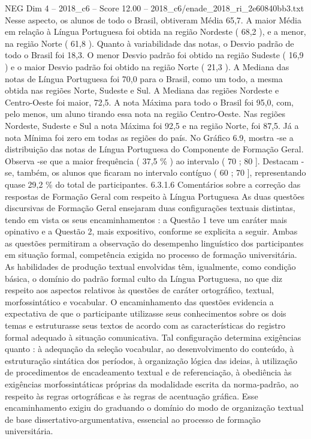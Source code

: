 \begin{textsample}{NEG Dim 4 – 2018\_c6 – Score 12.00 – 2018\_c6/enade\_2018\_ri\_2e60840bb3.txt}
Nesse aspecto, os alunos de todo o Brasil, obtiveram Média 65,7.
A maior Média em relação à Língua Portuguesa foi obtida na região Nordeste ( 68,2 ), e a menor, na região Norte ( 61,8 ).
Quanto à variabilidade das notas, o Desvio padrão de todo o Brasil foi 18,3.
O menor Desvio padrão foi obtido na região Sudeste ( 16,9 ) e o maior Desvio padrão foi obtido na região Norte ( 21,3 ).
A Mediana das notas de Língua Portuguesa foi 70,0 para o Brasil, como um todo, a mesma obtida nas regiões Norte, Sudeste e Sul.
A Mediana das regiões Nordeste e Centro-Oeste foi maior, 72,5.
A nota Máxima para todo o Brasil foi 95,0, com, pelo menos, um aluno tirando essa nota na região Centro-Oeste.
Nas regiões Nordeste, Sudeste e Sul a nota Máxima foi 92,5 e na região Norte, foi 87,5.
Já a nota Mínima foi zero em todas as regiões do país.
No Gráfico 6.9, mostra -se a distribuição das notas de Língua Portuguesa do Componente de Formação Geral.
Observa -se que a maior frequência ( 37,5 \% ) ao intervalo ( 70 ; 80 ].
Destacam -se, também, os alunos que ficaram no intervalo contíguo ( 60 ; 70 ], representando quase 29,2 \% do total de participantes. 6.3.1.6 Comentários sobre a correção das respostas de Formação Geral com respeito à Língua Portuguesa As duas questões discursivas de Formação Geral ensejaram duas configurações textuais distintas, tendo em vista os seus encaminhamentos : a Questão 1 teve um caráter mais opinativo e a Questão 2, mais expositivo, conforme se explicita a seguir.
Ambas as questões permitiram a observação do desempenho linguístico dos participantes em situação formal, competência exigida no processo de formação universitária.
As habilidades de produção textual envolvidas têm, igualmente, como condição básica, o domínio do padrão formal culto da Língua Portuguesa, no que diz respeito aos aspectos relativos às questões de caráter ortográfico, textual, morfossintático e vocabular.
O encaminhamento das questões evidencia a expectativa de que o participante utilizasse seus conhecimentos sobre os dois temas e estruturasse seus textos de acordo com as características do registro formal adequado à situação comunicativa.
Tal configuração determina exigências quanto : à adequação da seleção vocabular, ao desenvolvimento do conteúdo, à estruturação sintática dos períodos, à organização lógica das ideias, à utilização de procedimentos de encadeamento textual e de referenciação, à obediência às exigências morfossintáticas próprias da modalidade escrita da norma-padrão, ao respeito às regras ortográficas e às regras de acentuação gráfica.
Esse encaminhamento exigiu do graduando o domínio do modo de organização textual de base dissertativo-argumentativa, essencial ao processo de formação universitária.

\end{textsample}
